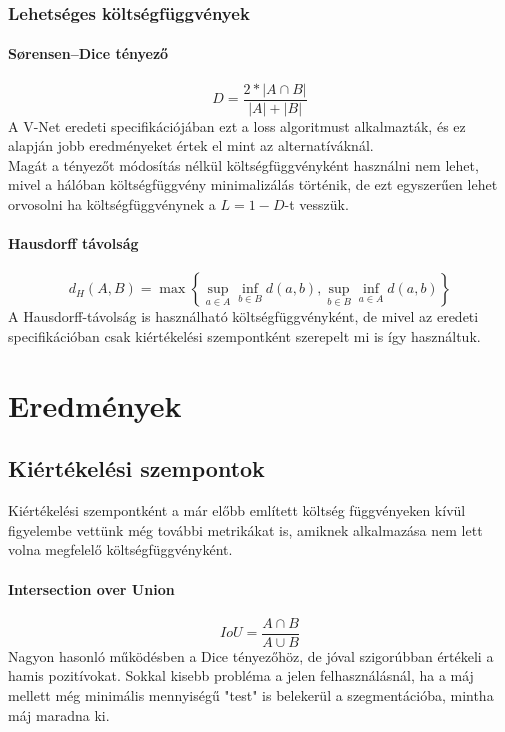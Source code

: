 \documentclass[a4paper]{article}
\begin{document}
	\subsubsection{Lehetséges költségfüggvények}
	\paragraph{Sørensen–Dice tényező}
	\begin{equation}
	D = \frac {2*|{A \cap B}|}{|A|+|B|}
	\end{equation}
	A V-Net eredeti specifikációjában\cite{2016arXiv160604797M} ezt a loss algoritmust alkalmazták, és ez alapján jobb eredményeket értek el mint az alternatíváknál.
	\\[1em]
	Magát a tényezőt módosítás nélkül költségfüggvényként használni nem lehet, mivel a hálóban költségfüggvény minimalizálás történik, de ezt egyszerűen lehet orvosolni ha költségfüggvénynek a \(L = 1-D\)-t vesszük.
	\paragraph{Hausdorff távolság}
	\begin{equation}
	{d}_{H}(A,B)  = \max\left\{ \sup_{a\in A} \inf_{b\in B} {d}(a,b),\sup_{b\in B} \inf_{a\in A}{d}(a,b)\right\}
	\end{equation}
	A Hausdorff-távolság is használható költségfüggvényként, de mivel az eredeti specifikációban\cite{2016arXiv160604797M} csak kiértékelési szempontként szerepelt mi is így használtuk.
	\pagebreak
	\section{Eredmények}
	\subsection{Kiértékelési szempontok}
	Kiértékelési szempontként a már előbb említett költség függvényeken kívül figyelembe vettünk még további metrikákat is, amiknek alkalmazása nem lett volna megfelelő költségfüggvényként.
	\paragraph{Intersection over Union}
	\begin{equation}
	IoU = \frac{A\cap B} {A \cup B}
	\end{equation}
	Nagyon hasonló működésben a Dice tényezőhöz, de jóval szigorúbban értékeli a hamis pozitívokat. Sokkal kisebb probléma a jelen felhasználásnál, ha a máj mellett még minimális mennyiségű "test" is belekerül a szegmentációba, mintha máj maradna ki.
\end{document}
